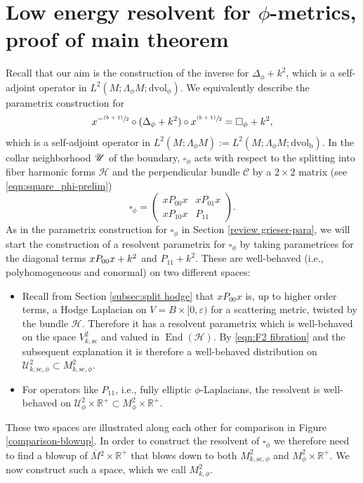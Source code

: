 \documentclass[11pt]{article}
\newcommand{\ie}{i.e.,\xspace}
\numberwithin{equation}{section}
\newcommand{\psfrac}[2]{\sfrac{(#1)}{#2}}
\theoremstyle{plain}
\theoremstyle{definition}
\newcommand{\R}{{\mathbb{R}}}
\newcommand{\Umath}{{\mathscr{U}}}
\newcommand{\Hmath}{{\mathscr{H}}}
\newcommand{\bb}{{\mathrm{b}}}
\newcommand{\ssc}{{\mathrm{sc}}}
\newcommand{\dvol}{\mathrm{dvol}}
\DeclareMathOperator{\End}{End}
\newcommand{\Mbar}{{\overline{M}}}\let\M\Mbar
\let\eps\varepsilon
\begin{document}
\section{Low energy resolvent for \texorpdfstring{$\phi$}{phi}-metrics, proof of main theorem} \label{sec:proof main thm}
Recall that our aim is the construction of the inverse for $\Delta_{\phi} +k^2$, which is a self-adjoint operator in $L^2(M;\Lambda_\phi M;\dvol_\phi)$. We equivalently describe the parametrix construction for
\[
x^{-\psfrac{b+1}{2}} \circ (\Delta_{\phi} +k^2) \circ x^{\psfrac{b+1}{2}} = \square_\phi + k^2,
\]
which is a self-adjoint operator in $L^2(M;\Lambda_\phi M):=L^2(M;\Lambda_\phi M;\dvol_\bb)$. In the collar neighborhood
$\mathscr{U}$ of the boundary, $\square_\phi$ acts with respect to the splitting into
fiber harmonic forms $\mathscr{H}$ and the perpendicular bundle $\mathscr{C}$ by
a $2\times 2$ matrix (see \eqref{eqn:square_phi-prelim})
\begin{equation*}
\square_\phi =
\begin{pmatrix}
xP_{00}x & xP_{01}x \\
xP_{10}x & P_{11}
\end{pmatrix}.
\end{equation*}
As in the parametrix construction for $\square_\phi$ in Section \ref{review grieser-para}, we will start the construction of a resolvent parametrix for $\square_\phi$ by taking parametrices for the diagonal terms $xP_{00}x+\nobreak k^2$ and $P_{11}+k^2$. These are
well-behaved (\ie polyhomogeneous and conormal) on two different spaces:
\begin{itemize}
\item
Recall from Section \ref{subsec:split hodge} that $xP_{00}x$ is, up to higher order terms, a Hodge Laplacian on $V=B\times[0,\eps)$ for a scattering metric, twisted by the bundle $\Hmath$. Therefore it has a resolvent parametrix which is
well-behaved on the space $V^2_{k,\ssc}$ and valued in $\End(\Hmath)$. By \eqref{eqn:F2 fibration} and the subsequent explanation it is therefore a well-behaved distribution on $\Umath^2_{k,\ssc,\phi}\subset M^2_{k,\ssc,\phi}$.
\item
For operators like $P_{11}$, \ie fully elliptic $\phi$-Laplacians, the resolvent is well-behaved on
$\Umath^{2}_{\phi} \times \R^+\subset M^{2}_{\phi} \times \R^+$.
\end{itemize}
These two spaces are illustrated along each
other for comparison in Figure \ref{comparison-blowup}.
In order to construct the resolvent of $\square_\phi$ we therefore need to find a blowup of
$\Mbar{}^2 \times \R^+$ that blows down to both $M^{2}_{k, \ssc,\phi}$ and $M^{2}_{\phi} \times \R^+$.
We now construct such a space, which we call $M^{2}_{k,\phi}$.
\end{document}
